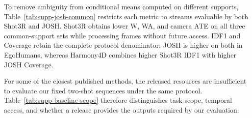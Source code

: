 \begin{table}[t]
  \centering
  \caption{JOSH execution and evaluable cases on the three primary protocols.
  Failed runs remain in the IDF1/Coverage calculations over all sequences;
  unavailable human or camera errors are omitted rather than set to zero.}
  \label{tab:supp-josh-support}
  \small
  \resizebox{0.88\textwidth}{!}{}
\end{table}

To remove ambiguity from conditional means computed on different supports,
Table~\ref{tab:supp-josh-common} restricts each metric to streams evaluable by
both Shot3R and JOSH. Shot3R obtains lower W, WA, and camera ATE on all three
common-support sets while processing frames without future access. IDF1 and
Coverage retain the complete protocol denominator: JOSH is higher on both in
EgoHumans, whereas Harmony4D combines higher Shot3R IDF1 with higher JOSH
Coverage.

\begin{table}[t]
  \centering
  \caption{Case-macro Shot3R--JOSH comparison restricted to streams evaluable
  by both methods. W/WA are in mm; ATE is Sim(3)-aligned for EgoBody and
  Harmony4D and SE(3)-aligned for EgoHumans, in m.}
  \label{tab:supp-josh-common}
  \small
  \resizebox{0.92\textwidth}{!}{}
\end{table}

\begin{table}[t]
  \centering
  \caption{Paired Shot3R gain over OnlineHMR with 95\% clustered bootstrap
  intervals. Positive values favour Shot3R.}
  \label{tab:supp-onlinehmr-paired}
  \scriptsize
  
\end{table}

For some of the closest published methods, the released resources are
insufficient to evaluate our fixed two-shot sequences under the same protocol.
Table~\ref{tab:supp-baseline-scope} therefore distinguishes task scope,
temporal access, and whether a release provides the outputs required by our
evaluation.

